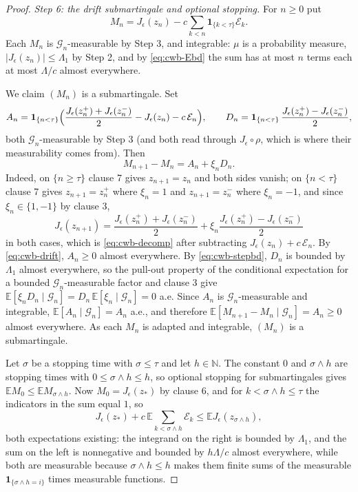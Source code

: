 \begin{proof}
\emph{Step 6: the drift submartingale and optional stopping.}
For $n\ge0$ put
\[
  M_n=J_\epsilon(z_n)-c\sum_{k<n}\mathbf1_{\{k<\tau\}}\mathcal E_k .
\]
Each $M_n$ is $\mathcal G_n$-measurable by Step 3, and integrable: $\mu$ is a
probability measure, $|J_\epsilon(z_n)|\le\Lambda_1$ by Step 2, and by
\eqref{eq:cwb-Ebd} the sum has at most $n$ terms each at most $\Lambda/c$
almost everywhere.

We claim $(M_n)$ is a submartingale. Set
\[
  A_n=\mathbf1_{\{n<\tau\}}
      \Bigl(\frac{J_\epsilon(z^+_n)+J_\epsilon(z^-_n)}{2}-J_\epsilon(z_n)
            -c\,\mathcal E_n\Bigr),\qquad
  D_n=\mathbf1_{\{n<\tau\}}\,
      \frac{J_\epsilon(z^+_n)-J_\epsilon(z^-_n)}{2},
\]
both $\mathcal G_n$-measurable by Step 3 (and both read through
$J_\epsilon\circ\rho$, which is where their measurability comes from). Then
\begin{equation}\label{eq:cwb-decomp}
  M_{n+1}-M_n=A_n+\xi_nD_n .
\end{equation}
Indeed, on $\{n\ge\tau\}$ clause 7 gives $z_{n+1}=z_n$ and both sides vanish; on
$\{n<\tau\}$ clause 7 gives $z_{n+1}=z^+_n$ where $\xi_n=1$ and
$z_{n+1}=z^-_n$ where $\xi_n=-1$, and since $\xi_n\in\{1,-1\}$ by clause 3,
\[
  J_\epsilon(z_{n+1})
   =\frac{J_\epsilon(z^+_n)+J_\epsilon(z^-_n)}{2}
    +\xi_n\frac{J_\epsilon(z^+_n)-J_\epsilon(z^-_n)}{2}
\]
in both cases, which is \eqref{eq:cwb-decomp} after subtracting
$J_\epsilon(z_n)+c\,\mathcal E_n$. By \eqref{eq:cwb-drift}, $A_n\ge0$ almost
everywhere. By \eqref{eq:cwb-stepbd}, $D_n$ is bounded by $\Lambda_1$ almost
everywhere, so the pull-out property of the conditional expectation for a
bounded $\mathcal G_n$-measurable factor and clause 3 give
$\mathbb E[\xi_nD_n\mid\mathcal G_n]=D_n\,\mathbb E[\xi_n\mid\mathcal G_n]=0$
a.e. Since $A_n$ is $\mathcal G_n$-measurable and integrable,
$\mathbb E[A_n\mid\mathcal G_n]=A_n$ a.e., and therefore
$\mathbb E[M_{n+1}-M_n\mid\mathcal G_n]=A_n\ge0$ almost everywhere. As each
$M_n$ is adapted and integrable, $(M_n)$ is a submartingale.

Let $\sigma$ be a stopping time with $\sigma\le\tau$ and let $h\in\mathbb N$.
The constant $0$ and $\sigma\wedge h$ are stopping times with
$0\le\sigma\wedge h\le h$, so optional stopping for submartingales gives
$\mathbb E M_0\le\mathbb E M_{\sigma\wedge h}$. Now $M_0=J_\epsilon(z_*)$ by
clause 6, and for $k<\sigma\wedge h\le\tau$ the indicators in the sum equal $1$,
so
\begin{equation}\label{eq:cwb-trunc}
  J_\epsilon(z_*)+c\,\mathbb E\sum_{k<\sigma\wedge h}\mathcal E_k
   \le\mathbb E J_\epsilon(z_{\sigma\wedge h}) ,
\end{equation}
both expectations existing: the integrand on the right is bounded by
$\Lambda_1$, and the sum on the left is nonnegative and bounded by
$h\Lambda/c$ almost everywhere, while both are measurable because
$\sigma\wedge h\le h$ makes them finite sums of the measurable
$\mathbf1_{\{\sigma\wedge h=i\}}$ times measurable functions.


\end{proof}
